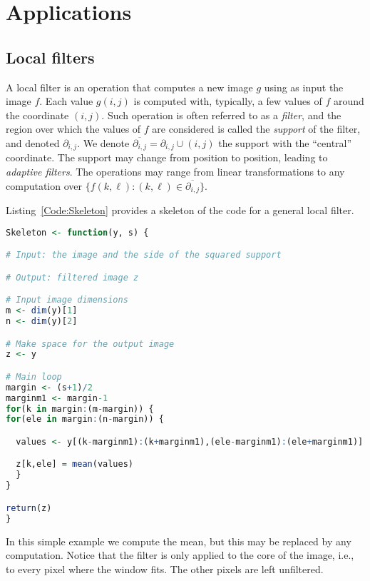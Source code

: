 \chapter{Applications}\label{Chapter:Applications}

\section{Local filters}

A local filter is an operation that computes a new image $g$ using as input the image $f$.
Each value $g(i,j)$ is computed with, typically, a few values of $f$ around the coordinate $(i,j)$.
Such operation is often referred to as a \textit{filter}, and the region over which the values of $f$ are considered is called the \textit{support} of the filter, and denoted $\partial_{i,j}$.
We denote $\overline{\partial_{i,j}}=\partial_{i,j}\cup(i,j)$ the support with the ``central'' coordinate.
The support may change from position to position, leading to \textit{adaptive filters}.
The operations may range from linear transformations to any computation over $\{f(k,\ell)\colon (k,\ell)\in\overline{\partial_{i,j}}\}$.

Listing~\ref{Code:Skeleton} provides a skeleton of the code for a general local filter.

\begin{lstlisting}[language=R,label=Code:Skeleton,frame=tb,caption={Skeleton for local filters}]
Skeleton <- function(y, s) {

# Input: the image and the side of the squared support

# Output: filtered image z

# Input image dimensions
m <- dim(y)[1]
n <- dim(y)[2]

# Make space for the output image
z <- y

# Main loop
margin <- (s+1)/2
marginm1 <- margin-1
for(k in margin:(m-margin)) {
for(ele in margin:(n-margin)) {

  values <- y[(k-marginm1):(k+marginm1),(ele-marginm1):(ele+marginm1)]

  z[k,ele] = mean(values)
  }
}

return(z)
}
\end{lstlisting}

In this simple example we compute the mean, but this may be replaced by any computation.
Notice that the filter is only applied to the core of the image, i.e., to every pixel where the window fits.
The other pixels are left unfiltered.


